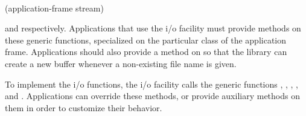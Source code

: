 \\
{(application-frame stream)}

 and
 respectively.
Applications that use the \sysname{} i/o facility must provide methods
on these generic functions, specialized on the particular class of the
application frame.  Applications should also provide a method on
 so that the \sysname{}
library can create a new buffer whenever a non-existing file name is
given.

To implement the i/o functions, the \sysname{} i/o facility calls the
generic functions ,
,
,
, and
.  Applications can override these
methods, or provide auxiliary methods on them in order to customize
their behavior.

